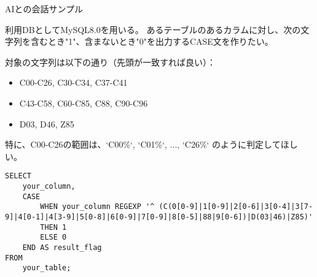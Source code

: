 \documentclass[uplatex,dvipdfmx,9pt,a4paper]{beamer}
\begin{document}
\begin{frame}[fragile]{AIとの会話サンプル}

  \begin{mychat}
    利用DBとしてMySQL8.0を用いる。
    あるテーブルのあるカラムに対し、次の文字列を含むとき"1"、含まないとき"0"を出力するCASE文を作りたい。

    対象の文字列は以下の通り（先頭が一致すれば良い）：
    \begin{itemize}
        \item C00-C26, C30-C34, C37-C41
        \item C43-C58, C60-C85, C88, C90-C96
        \item D03, D46, Z85
    \end{itemize}
    特に、C00-C26の範囲は、`C00\%`, `C01\%`, ..., `C26\%` のように判定してほしい。
  \end{mychat}

  \begin{aichat}
    \scriptsize
    \begin{verbatim}
SELECT
    your_column,
    CASE
        WHEN your_column REGEXP '^ (C(0[0-9]|1[0-9]|2[0-6]|3[0-4]|3[7-9]|4[0-1]|4[3-9]|5[0-8]|6[0-9]|7[0-9]|8[0-5]|88|9[0-6])|D(03|46)|Z85)'
        THEN 1
        ELSE 0
    END AS result_flag
FROM
    your_table;
    \end{verbatim}
  \small
  \end{aichat}

\end{frame}
\end{document}
